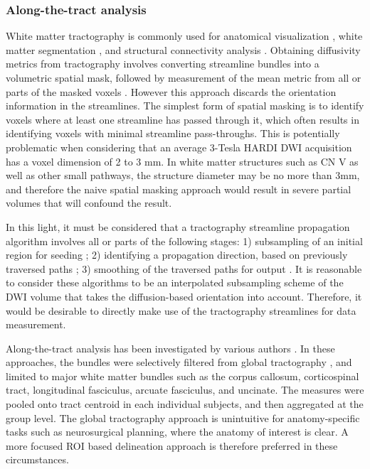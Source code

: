 \subsubsection{Along-the-tract analysis}
White matter tractography is commonly used for anatomical visualization \cite{Chen2011b}, white matter segmentation \cite{Behrens2003a,Johansen-Berg2005}, and structural connectivity analysis \cite{Cao2013,Wiech2014}. Obtaining diffusivity metrics from tractography involves converting streamline bundles into a volumetric spatial mask, followed by measurement of the mean metric from all or parts of the masked voxels \cite{Concha2005,Fitzsimmons2009}. However this approach discards the orientation information in the streamlines. The simplest form of spatial masking is to identify voxels where at least one streamline has passed through it, which often results in identifying voxels with minimal streamline pass-throughs. This is potentially problematic when considering that an average 3-Tesla HARDI DWI acquisition has a voxel dimension of 2 to 3 mm. In white matter structures such as CN V as well as other small pathways, the structure diameter may be no more than 3mm, and therefore the naive spatial masking approach would result in severe partial volumes that will confound the result. 

In this light, it must be considered that a tractography streamline propagation algorithm involves all or parts of the following stages: 1) subsampling of an initial region for seeding \cite{Basser2002,Cote2012}; 2) identifying a propagation direction, based on previously traversed paths \cite{Malcolm2010,Qazi2009,Tournier2010}; 3) smoothing of the traversed paths for output \cite{Tuch2000d}. It is reasonable to consider these algorithms to be an interpolated subsampling scheme of the DWI volume that takes the diffusion-based orientation into account. Therefore, it would be desirable to directly make use of the tractography streamlines for data measurement. 

Along-the-tract analysis has been investigated by various authors \cite{Colby2012,ODonnell2009,Wang2015,Yeatman2012}. In these approaches, the bundles were selectively filtered from global tractography \cite{Wang2015,Yeatman2012}, and limited to major white matter bundles such as the corpus callosum, corticospinal tract, longitudinal fasciculus, arcuate fasciculus, and uncinate. The measures were pooled onto tract centroid in each individual subjects, and then aggregated at the group level. The global tractography approach is unintuitive for anatomy-specific tasks such as neurosurgical planning, where the anatomy of interest is clear. A more focused ROI based delineation approach is therefore preferred in these circumstances.


